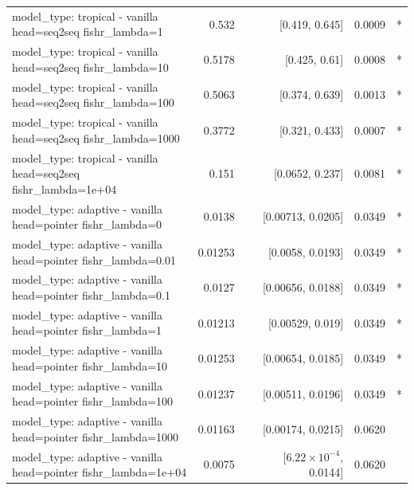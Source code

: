 \documentclass[10pt]{article}
\makeatletter
\newcommand{\stackcell}[1]{\begin{tabular}[t]{@{}l@{}}#1\end{tabular}}
\makeatother
\begin{document}
{\begin{longtable}{lrrrl}
\stackcell{model\_type: tropical - vanilla\\\footnotesize head=seq2seq fishr\_lambda=1 } & 0.532 & [0.419, 0.645] & 0.0009 & *\\
\stackcell{model\_type: tropical - vanilla\\\footnotesize head=seq2seq fishr\_lambda=10 } & 0.5178 & [0.425, 0.61] & 0.0008 & *\\
\stackcell{model\_type: tropical - vanilla\\\footnotesize head=seq2seq fishr\_lambda=100 } & 0.5063 & [0.374, 0.639] & 0.0013 & *\\
\stackcell{model\_type: tropical - vanilla\\\footnotesize head=seq2seq fishr\_lambda=1000 } & 0.3772 & [0.321, 0.433] & 0.0007 & *\\
\stackcell{model\_type: tropical - vanilla\\\footnotesize head=seq2seq fishr\_lambda=1e+04 } & 0.151 & [0.0652, 0.237] & 0.0081 & *\\
\stackcell{model\_type: adaptive - vanilla\\\footnotesize head=pointer fishr\_lambda=0 } & 0.0138 & [0.00713, 0.0205] & 0.0349 & *\\
\stackcell{model\_type: adaptive - vanilla\\\footnotesize head=pointer fishr\_lambda=0.01 } & 0.01253 & [0.0058, 0.0193] & 0.0349 & *\\
\stackcell{model\_type: adaptive - vanilla\\\footnotesize head=pointer fishr\_lambda=0.1 } & 0.0127 & [0.00656, 0.0188] & 0.0349 & *\\
\stackcell{model\_type: adaptive - vanilla\\\footnotesize head=pointer fishr\_lambda=1 } & 0.01213 & [0.00529, 0.019] & 0.0349 & *\\
\stackcell{model\_type: adaptive - vanilla\\\footnotesize head=pointer fishr\_lambda=10 } & 0.01253 & [0.00654, 0.0185] & 0.0349 & *\\
\stackcell{model\_type: adaptive - vanilla\\\footnotesize head=pointer fishr\_lambda=100 } & 0.01237 & [0.00511, 0.0196] & 0.0349 & *\\
\stackcell{model\_type: adaptive - vanilla\\\footnotesize head=pointer fishr\_lambda=1000 } & 0.01163 & [0.00174, 0.0215] & 0.0620 & \\
\stackcell{model\_type: adaptive - vanilla\\\footnotesize head=pointer fishr\_lambda=1e+04 } & 0.0075 & [$6.22\times10^{-4}$, 0.0144] & 0.0620 & \\

\end{longtable}}
\end{document}

